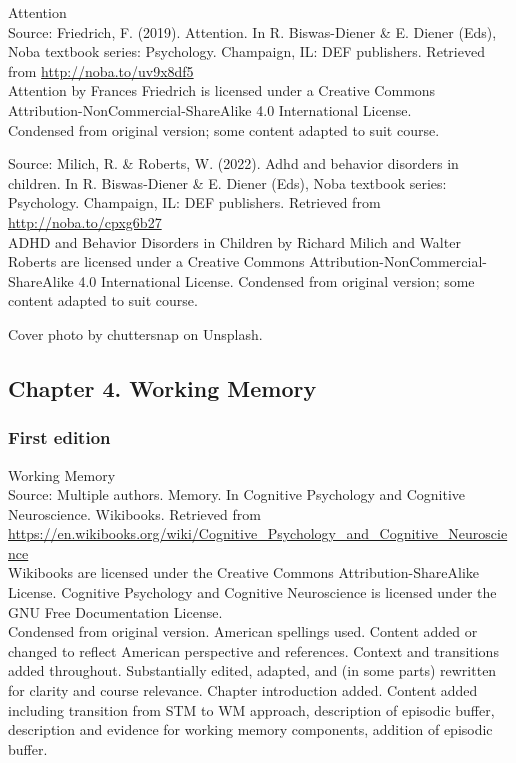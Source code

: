 \documentclass[
]{krantz}
\begin{document}
Attention\\
Source: Friedrich, F. (2019). Attention. In R. Biswas-Diener \& E. Diener (Eds), Noba textbook series: Psychology. Champaign, IL: DEF publishers. Retrieved from \url{http://noba.to/uv9x8df5}\\
Attention by Frances Friedrich is licensed under a Creative Commons Attribution-NonCommercial-ShareAlike 4.0 International License.\\
Condensed from original version; some content adapted to suit course.

Source: Milich, R. \& Roberts, W. (2022). Adhd and behavior disorders in children. In R. Biswas-Diener \& E. Diener (Eds), Noba textbook series: Psychology. Champaign, IL: DEF publishers. Retrieved from \url{http://noba.to/cpxg6b27}\\
ADHD and Behavior Disorders in Children by Richard Milich and Walter Roberts are licensed under a Creative Commons Attribution-NonCommercial-ShareAlike 4.0 International License.
Condensed from original version; some content adapted to suit course.

Cover photo by chuttersnap on Unsplash.

\hypertarget{chapter-4.-working-memory}{%
\subsection*{Chapter 4. Working Memory}\label{chapter-4.-working-memory}}


\hypertarget{first-edition-4}{%
\subsubsection*{First edition}\label{first-edition-4}}


Working Memory\\
Source: Multiple authors. Memory. In Cognitive Psychology and Cognitive Neuroscience. Wikibooks. Retrieved from \url{https://en.wikibooks.org/wiki/Cognitive_Psychology_and_Cognitive_Neuroscience}\\
Wikibooks are licensed under the Creative Commons Attribution-ShareAlike License.
Cognitive Psychology and Cognitive Neuroscience is licensed under the GNU Free Documentation License.\\
Condensed from original version. American spellings used. Content added or changed to reflect American perspective and references. Context and transitions added throughout. Substantially edited, adapted, and (in some parts) rewritten for clarity and course relevance. Chapter introduction added. Content added including transition from STM to WM approach, description of episodic buffer, description and evidence for working memory components, addition of episodic buffer.
\end{document}
